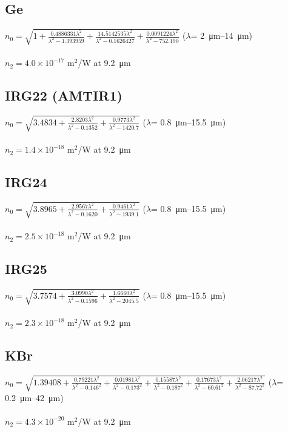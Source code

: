\documentclass{report}
\begin{document}
\begin{appendices}
\subsection*{Ge}
$n_0=\sqrt{1+\frac{0.4886331\lambda^2}{\lambda^2-1.393959}+\frac{14.5142535\lambda^2}{\lambda^2-0.1626427}+\frac{0.0091224\lambda^2}{\lambda^2-752.190}}$ (\(\lambda\)= \SIrange{2}{14}{\micro\meter}) \cite{Burnett-2016}\\
\\
$n_2 = 4.0\times 10^{-17}$ m$^2$/W at \SI{9.2}{\micro\meter} \cite{Polyanskiy-2023}

\subsection*{IRG22 (AMTIR1)}
$n_0=\sqrt{3.4834+\frac{2.8203\lambda^2}{\lambda^2-0.1352}+\frac{0.9773\lambda^2}{\lambda^2-1420.7}}$ (\(\lambda\)= \SIrange{0.8}{15.5}{\micro\meter}) \cite{IRG22}\\
\\
$n_2 = 1.4\times 10^{-18}$ m$^2$/W at \SI{9.2}{\micro\meter} \cite{Polyanskiy-2023}

\subsection*{IRG24}
$n_0=\sqrt{3.8965+\frac{2.9567\lambda^2}{\lambda^2-0.1620}+\frac{0.9461\lambda^2}{\lambda^2-1939.1}}$ (\(\lambda\)= \SIrange{0.8}{15.5}{\micro\meter}) \cite{IRG24}\\
\\
$n_2 = 2.5\times 10^{-18}$ m$^2$/W at \SI{9.2}{\micro\meter} \cite{Polyanskiy-2023}

\subsection*{IRG25}
$n_0=\sqrt{3.7574+\frac{3.0990\lambda^2}{\lambda^2-0.1596}+\frac{1.6660\lambda^2}{\lambda^2-2045.5}}$ (\(\lambda\)= \SIrange{0.8}{15.5}{\micro\meter}) \cite{IRG25}\\
\\
$n_2 = 2.3\times 10^{-18}$ m$^2$/W at \SI{9.2}{\micro\meter} \cite{Polyanskiy-2023}

\subsection*{KBr}
$n_0=\sqrt{1.39408+\frac{0.79221\lambda^2}{\lambda^2-0.146^2}+\frac{0.01981\lambda^2}{\lambda^2-0.173^2}+\frac{0.15587\lambda^2}{\lambda^2-0.187^2}+\frac{0.17673\lambda^2}{\lambda^2-60.61^2}+\frac{2.06217\lambda^2}{\lambda^2-87.72^2}}$ (\(\lambda\)= \SIrange{0.2}{42}{\micro\meter}) \cite{Li-1976}\\
\\
$n_2 = 4.3 \times 10^{-20}$ m$^2$/W at \SI{9.2}{\micro\meter} \cite{Polyanskiy-2023}


\end{appendices}
\end{document}

